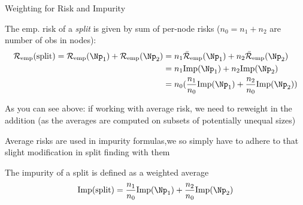 \documentclass[11pt,compress,t,notes=noshow, xcolor=table]{beamer}
\begin{document}
\begin{framei}[sep=M]{Weighting for Risk and Impurity}

\item The emp. risk of a \emph{split} is given by sum of per-node risks ($n_0 = n_1 + n_2$ are number of obs in nodes): 
\begin{align*}
\riske(\text{split}) = \riske(\Np_1) + \riske(\Np_2) & = n_1 \riskeb(\Np_1) + n_2 \riskeb(\Np_2) \\
& =  n_1 \text{Imp}(\Np_1) + n_2 \text{Imp}(\Np_2) \\
& = n_0 (\frac{n_1}{n_0} \text{Imp}(\Np_1) + \frac{n_2}{n_0} \text{Imp}(\Np_2))
\end{align*}

\item As you can see above: if working with average risk, we need to reweight in the addition (as the averages are computed on subsets of potentially unequal sizes) 

\item Average risks are used in impurity formulas,we so simply have to adhere to that slight modification in split finding with them

\item The impurity of a split is defined as a weighted average
$$\text{Imp(split)} = \frac{n_1}{n_0} \text{Imp}(\Np_1) + \frac{n_2}{n_0} \text{Imp}(\Np_2)$$






\end{framei}


\endlecture
\end{document}
